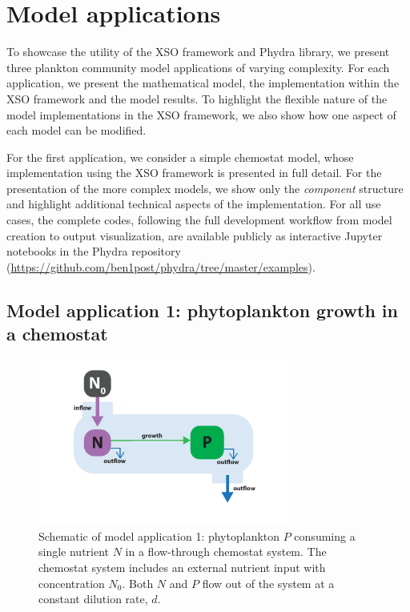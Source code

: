 \documentclass[journal abbreviation, manuscript]{copernicus}
\begin{document}
\section{Model applications} \label{Section:UseCases}

To showcase the utility of the XSO framework and Phydra library, we present three plankton community model applications of varying complexity. For each application, we present the mathematical model, the implementation within the XSO framework and the model results. To highlight the flexible nature of the model implementations in the XSO framework, we also show how one aspect of each model can be modified.

For the first application, we consider a simple chemostat model, whose implementation using the XSO framework is presented in full detail. For the presentation of the more complex models, we show only the \textit{component} structure and highlight additional technical aspects of the implementation. For all use cases, the complete codes, following the full development workflow from model creation to output visualization, are available publicly as interactive Jupyter notebooks in the Phydra repository (\url{https://github.com/ben1post/phydra/tree/master/examples}).

\subsection{Model application 1: phytoplankton growth in a chemostat}
\begin{figure}[t]
\includegraphics[width=8.3cm]{Figures/firstdraft_schematics/01_schematics_Chemostat.pdf}
\caption{Schematic of model application 1: phytoplankton $P$ consuming a single nutrient $N$ in a flow-through chemostat system. The chemostat system includes an external nutrient input with concentration $N_0$. Both $N$ and $P$ flow out of the system at a constant dilution rate, $d$.}
\label{Figure:ModelSchematics_1}
\end{figure}
\end{document}
